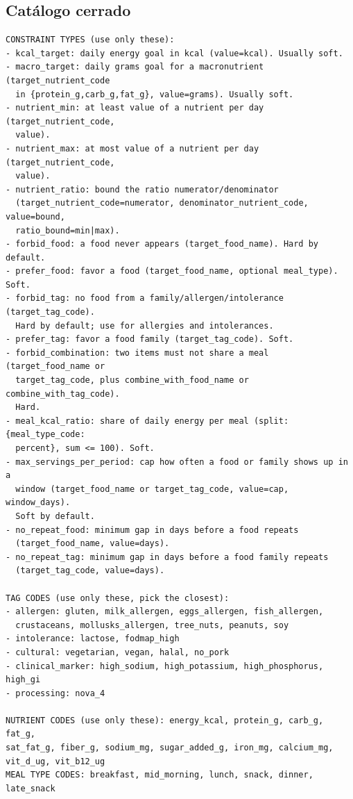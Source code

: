 \subsection*{Catálogo cerrado}

\begin{footnotesize}
\begin{verbatim}
CONSTRAINT TYPES (use only these):
- kcal_target: daily energy goal in kcal (value=kcal). Usually soft.
- macro_target: daily grams goal for a macronutrient (target_nutrient_code
  in {protein_g,carb_g,fat_g}, value=grams). Usually soft.
- nutrient_min: at least value of a nutrient per day (target_nutrient_code,
  value).
- nutrient_max: at most value of a nutrient per day (target_nutrient_code,
  value).
- nutrient_ratio: bound the ratio numerator/denominator
  (target_nutrient_code=numerator, denominator_nutrient_code, value=bound,
  ratio_bound=min|max).
- forbid_food: a food never appears (target_food_name). Hard by default.
- prefer_food: favor a food (target_food_name, optional meal_type). Soft.
- forbid_tag: no food from a family/allergen/intolerance (target_tag_code).
  Hard by default; use for allergies and intolerances.
- prefer_tag: favor a food family (target_tag_code). Soft.
- forbid_combination: two items must not share a meal (target_food_name or
  target_tag_code, plus combine_with_food_name or combine_with_tag_code).
  Hard.
- meal_kcal_ratio: share of daily energy per meal (split: {meal_type_code:
  percent}, sum <= 100). Soft.
- max_servings_per_period: cap how often a food or family shows up in a
  window (target_food_name or target_tag_code, value=cap, window_days).
  Soft by default.
- no_repeat_food: minimum gap in days before a food repeats
  (target_food_name, value=days).
- no_repeat_tag: minimum gap in days before a food family repeats
  (target_tag_code, value=days).

TAG CODES (use only these, pick the closest):
- allergen: gluten, milk_allergen, eggs_allergen, fish_allergen,
  crustaceans, mollusks_allergen, tree_nuts, peanuts, soy
- intolerance: lactose, fodmap_high
- cultural: vegetarian, vegan, halal, no_pork
- clinical_marker: high_sodium, high_potassium, high_phosphorus, high_gi
- processing: nova_4

NUTRIENT CODES (use only these): energy_kcal, protein_g, carb_g, fat_g,
sat_fat_g, fiber_g, sodium_mg, sugar_added_g, iron_mg, calcium_mg,
vit_d_ug, vit_b12_ug
MEAL TYPE CODES: breakfast, mid_morning, lunch, snack, dinner, late_snack
\end{verbatim}
\end{footnotesize}


